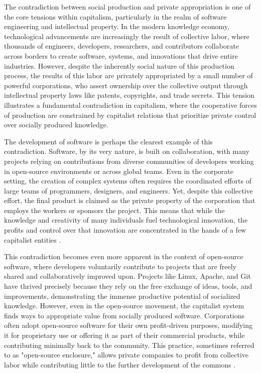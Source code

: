 The contradiction between social production and private appropriation is one of the core tensions within capitalism, particularly in the realm of software engineering and intellectual property. In the modern knowledge economy, technological advancements are increasingly the result of collective labor, where thousands of engineers, developers, researchers, and contributors collaborate across borders to create software, systems, and innovations that drive entire industries. However, despite the inherently social nature of this production process, the results of this labor are privately appropriated by a small number of powerful corporations, who assert ownership over the collective output through intellectual property laws like patents, copyrights, and trade secrets. This tension illustrates a fundamental contradiction in capitalism, where the cooperative forces of production are constrained by capitalist relations that prioritize private control over socially produced knowledge.

The development of software is perhaps the clearest example of this contradiction. Software, by its very nature, is built on collaboration, with many projects relying on contributions from diverse communities of developers working in open-source environments or across global teams. Even in the corporate setting, the creation of complex systems often requires the coordinated efforts of large teams of programmers, designers, and engineers. Yet, despite this collective effort, the final product is claimed as the private property of the corporation that employs the workers or sponsors the project. This means that while the knowledge and creativity of many individuals fuel technological innovation, the profits and control over that innovation are concentrated in the hands of a few capitalist entities \cite[pp.~264-266]{marx1867}.

This contradiction becomes even more apparent in the context of open-source software, where developers voluntarily contribute to projects that are freely shared and collaboratively improved upon. Projects like Linux, Apache, and Git have thrived precisely because they rely on the free exchange of ideas, tools, and improvements, demonstrating the immense productive potential of socialized knowledge. However, even in the open-source movement, the capitalist system finds ways to appropriate value from socially produced software. Corporations often adopt open-source software for their own profit-driven purposes, modifying it for proprietary use or offering it as part of their commercial products, while contributing minimally back to the community. This practice, sometimes referred to as "open-source enclosure," allows private companies to profit from collective labor while contributing little to the further development of the commons \cite[pp.~12-14]{stallman2002}.

